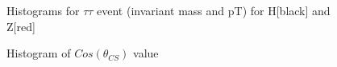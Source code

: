 \documentclass[10pt]{article}
\begin{document}
\begin{figure}[h] \centering
{}
\caption{Histograms for $\tau \tau$ event (invariant mass and pT) for H[black] and Z[red]}
\end{figure}
\begin{figure}[h] \centering
{}
\caption{Histogram of $Cos(\theta _{CS})$ value}
\end{figure}
\end{document}
